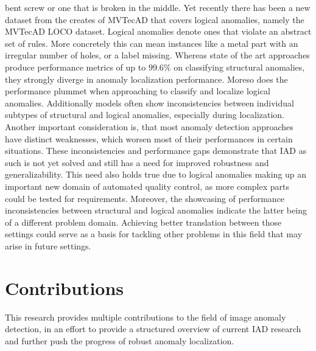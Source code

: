 bent screw or one that is broken in the middle. Yet recently there has been a new dataset from the creates of MVTecAD that covers logical 
anomalies, namely the MVTecAD LOCO \cite{LOCODentsAndScratchesBergmann2022} dataset. Logical anomalies denote ones that violate an abstract 
set of rules. More concretely this can mean instances like a metal part with an irregular number of holes, or a label missing. Whereas 
state of the art approaches produce performance metrics of up to $99.6 \% $ on classifying structural anomalies, they 
strongly diverge in anomaly localization performance. Moreso does the performance plummet when approaching to classify and localize logical 
anomalies. Additionally models often show inconsistencies between individual subtypes of structural and logical anomalies, especially during 
localization. Another important consideration is, that most anomaly detection approaches have distinct weaknesses, which worsen most 
of their performances in certain situations. These inconsistencies and performance gaps demonstrate that IAD as such is not yet solved and still has a need for improved 
robustness and generalizability. This need also holds true due to logical anomalies making up an important new domain of automated 
quality control, as more complex parts could be tested for requirements. Moreover, the showcasing of performance inconsistencies between 
structural and logical anomalies indicate the latter being of a different problem domain. Achieving better translation between those 
settings could serve as a basis for tackling other problems in this field that may arise in future settings.


\section{Contributions}
\label{sec:contributions}
This research provides multiple contributions to the field of image anomaly detection, in an effort to provide a structured overview of current IAD research and 
further push the progress of robust anomaly localization. 

